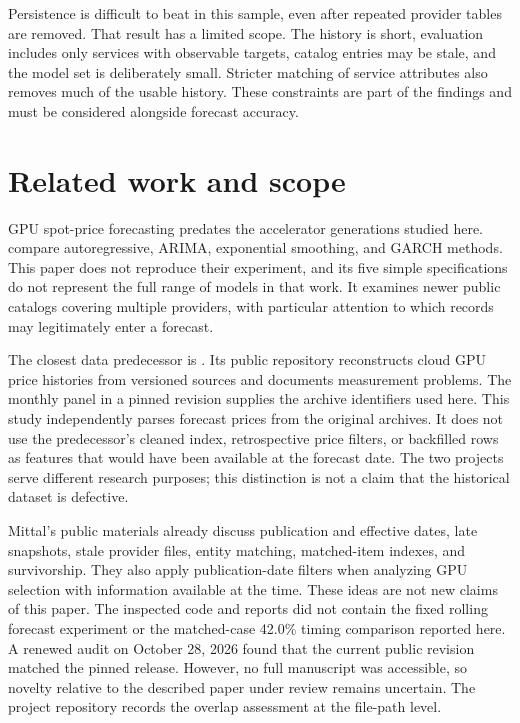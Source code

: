 \documentclass[10pt]{article}
\begin{document}
Persistence is difficult to beat in this sample, even after repeated provider tables are removed. That result has a limited scope. The history is short, evaluation includes only services with observable targets, catalog entries may be stale, and the model set is deliberately small. Stricter matching of service attributes also removes much of the usable history. These constraints are part of the findings and must be considered alongside forecast accuracy.

\section{Related work and scope}

GPU spot-price forecasting predates the accelerator generations studied here. \citet{khan2022} compare autoregressive, ARIMA, exponential smoothing, and GARCH methods. This paper does not reproduce their experiment, and its five simple specifications do not represent the full range of models in that work. It examines newer public catalogs covering multiple providers, with particular attention to which records may legitimately enter a forecast.

The closest data predecessor is \citet{mittal2026}. Its public repository reconstructs cloud GPU price histories from versioned sources and documents measurement problems. The monthly panel in a pinned revision supplies the archive identifiers used here. This study independently parses forecast prices from the original archives. It does not use the predecessor's cleaned index, retrospective price filters, or backfilled rows as features that would have been available at the forecast date. The two projects serve different research purposes; this distinction is not a claim that the historical dataset is defective.

Mittal's public materials already discuss publication and effective dates, late snapshots, stale provider files, entity matching, matched-item indexes, and survivorship. They also apply publication-date filters when analyzing GPU selection with information available at the time. These ideas are not new claims of this paper. The inspected code and reports did not contain the fixed rolling forecast experiment or the matched-case 42.0\% timing comparison reported here. A renewed audit on October 28, 2026 found that the current public revision matched the pinned release. However, no full manuscript was accessible, so novelty relative to the described paper under review remains uncertain. The project repository records the overlap assessment at the file-path level.
\end{document}

